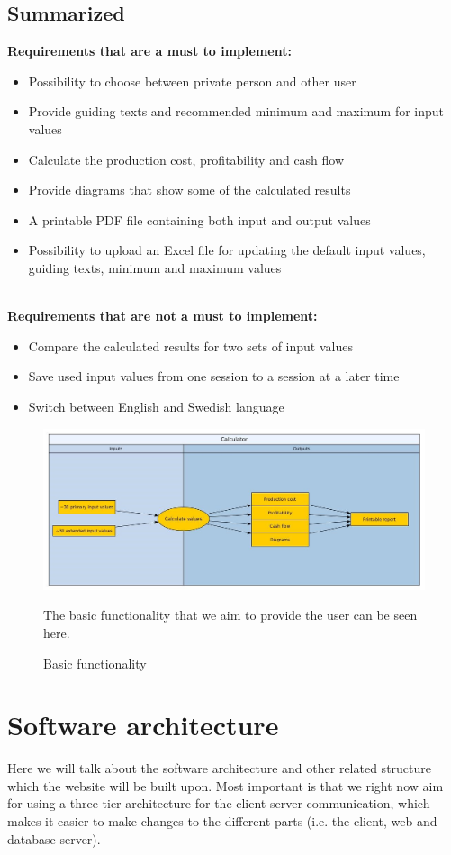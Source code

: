 \documentclass[]{article}
\begin{document}
\subsection{Summarized}

\textbf{Requirements that are a must to implement:}
\begin{itemize}
	\item Possibility to choose between private person and other user
	\item Provide guiding texts and recommended minimum and maximum for input values
	\item Calculate the production cost, profitability and cash flow
	\item Provide diagrams that show some of the calculated results
	\item A printable PDF file containing both input and output values
	\item Possibility to upload an Excel file for updating the default input values, guiding texts, minimum and maximum values
\end{itemize}	
\\
\textbf{Requirements that are not a must to implement:}
\begin{itemize}
	\item Compare the calculated results for two sets of input values
	\item Save used input values from one session to a session at a later time
	\item Switch between English and Swedish language
\end{itemize}

\begin{figure}[H]
	\includegraphics[width=1.0\linewidth]{Bild1}
	\caption{Basic functionality}
	\medskip
	\small
	The basic functionality that we aim to provide the user can be seen here.
	\label{fig:Bild1}
\end{figure}

\section{Software architecture}
Here we will talk about the software architecture and other related structure which the website will be built upon. Most important is that we right now aim for using a three-tier architecture for the client-server communication, which makes it easier to make changes to the different parts (i.e. the client, web and database server). 
\end{document}
